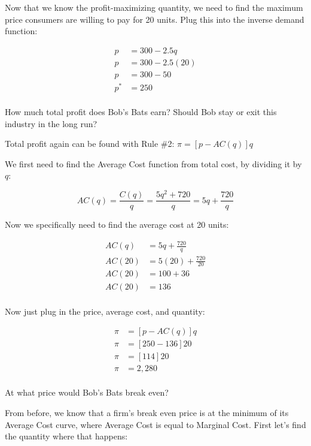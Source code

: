 \documentclass[12 pt]{exam}
\begin{document}
\begin{questions}
\begin{solution}
Now that we know the profit-maximizing quantity, we need to find the maximum price consumers are willing to pay for 20 units. Plug this into the inverse demand function:

\begin{align*}
p&=300-2.5q\\
p&=300-2.5(20)\\
p&=300-50\\
p^*&=250\\
\end{align*}

\end{solution}

\question How much total profit does Bob's Bats earn? Should Bob stay or exit this industry in the long run?

\begin{solution}

Total profit again can be found with Rule \#2: $\pi=[p-AC(q)]q$

We first need to find the Average Cost function from total cost, by dividing it by $q$:

$$AC(q) = \frac{C(q)}{q} = \frac{5q^2+720}{q} = 5q+\frac{720}{q}$$

Now we specifically need to find the average cost at 20 units:

\begin{align*}
AC(q)&=5q+\frac{720}{q}\\
AC(20)&=5(20)+\frac{720}{20}\\
AC(20)&=100+36\\
AC(20)&=136\\
\end{align*}

Now just plug in the price, average cost, and quantity:

\begin{align*}
\pi&=[p-AC(q)]q\\
\pi&=[250-136]20\\
\pi&=[114]20\\
\pi&=2,280\\
\end{align*}

\end{solution}

\question At what price would Bob's Bats break even?

\begin{solution}

From before, we know that a firm's break even price is at the minimum of its Average Cost curve, where Average Cost is equal to Marginal Cost. First let's find the quantity where that happens:


\end{solution}
\end{questions}
\end{document}
